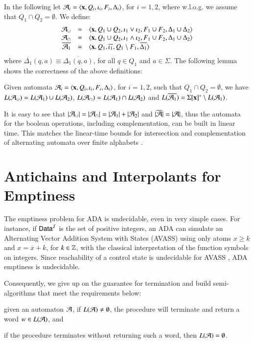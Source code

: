 \documentclass[10pt]{llncs}
\begin{document}
In the following let $\mathcal{A}_i =
\left\langle \mathbf x,Q_i,\iota_i,F_i,\Delta_i \right\rangle$, for $i=1,2$, where
w.l.o.g. we assume that $Q_1 \cap Q_2 = \emptyset$. We define:
\[\begin{array}{rcl}
\mathcal{A}_\cup & = & \left\langle \mathbf x,Q_1\cup Q_2,\iota_1 \vee \iota_2,F_1\cup F_2,\Delta_1\cup\Delta_2 \right\rangle \\ 
\mathcal{A}_\cap & = & \left\langle \mathbf x,Q_1\cup Q_2,\iota_1 \wedge \iota_2, F_1\cup F_2, \Delta_1\cup\Delta_2 \right\rangle \\ 
\overline{\mathcal{A}_1} & = & \langle \mathbf x,Q_1,\overline{\iota_1},Q_1\setminus F_1,\overline{\Delta_1} \rangle
\end{array}\] 
where $\overline{\Delta_1}(q,a) \equiv \overline{\Delta_1(q,a)}$, for
all $q \in Q_1$ and $a \in \Sigma$. The following lemma shows the
correctness of the above definitions:

\begin{lemma}\label{lemma:closure}
  Given automata $\mathcal{A}_i = \left\langle \mathbf x,Q_i,\iota_i,F_i,\Delta_i \right\rangle$,
  for $i=1,2$, such that $Q_1 \cap Q_2 = \emptyset$, we have
  $L(\mathcal{A}_\cup) = L(\mathcal{A}_1) \cup L(\mathcal{A}_2)$, $L(\mathcal{A}_\cap) = L(\mathcal{A}_1) \cap
  L(\mathcal{A}_2)$ and $L(\overline{\mathcal{A}_1}) = \Sigma[\mathbf x]^* \setminus
  L(\mathcal{A}_1)$.
\end{lemma}

It is easy to see that ${|{\mathcal{A}_\cup}|} = {|{\mathcal{A}_\cap}|} = {|{\mathcal{A}_1}|} +
{|{\mathcal{A}_2}|}$ and ${|{\overline{\mathcal{A}}}|} = {|{\mathcal{A}}|}$, thus the automata
for the boolean operations, including complementation, can be built in
linear time. This matches the linear-time bounds for intersection and
complementation of alternating automata over finite alphabets
\cite{ChandraKozenStockmeyer81}.

\section{Antichains and Interpolants for Emptiness}

The emptiness problem for ADA is undecidable, even in very simple
cases. For instance, if $\mathsf{Data}^{\mathcal{I}}$ is the set of positive integers, an
ADA can simulate an Alternating Vector Addition System with States
(AVASS) using only atoms $x \geq k$ and $x = \overline{x} + k$, for $k
\in {\bf \mathbb{Z}}$, with the classical interpretation of the function symbols
on integers. Since reachability of a control state is undecidable for
AVASS \cite{LINCOLN92}, ADA emptiness is undecidable.

Consequently, we give up on the guarantee for termination and build
semi-algorithms that meet the requirements below: \begin{compactenum}[(i)]
\item given an automaton $\mathcal{A}$, if $L(\mathcal{A}) \neq\emptyset$, the procedure
  will terminate and return a word $w \in L(\mathcal{A})$, and
%
\item if the procedure terminates without returning such a word, then
  $L(\mathcal{A}) = \emptyset$.
\end{compactenum}
\end{document}

